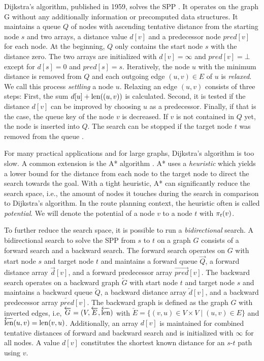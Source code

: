Dijkstra's algorithm, published in 1959, solves the SPP \cite{dijkstra:1959}. It operates on the graph G without any additionally information or precomputed data structures. It maintains a queue $Q$ of nodes with ascending tentative distance from the starting node $s$ and two arrays, a distance value $d[v]$ and a predecessor node $pred[v]$ for each node. At the beginning, $Q$ only contains the start node $s$ with the distance zero. The two arrays are initialized with $d[v]=\infty$ and $pred[v]=\bot$ except for $d[s]=0$ and $pred[s]=s$. Iteratively, the node $u$ with the minimum distance is removed from $Q$ and each outgoing edge $(u,v) \in E$ of $u$ is \emph{relaxed}. We call this process \emph{settling} a node $u$. Relaxing an edge $(u,v)$ consists of three steps: First, the sum $d[u] + \operatorname{len}((u,v))$ is calculated. Second, it is tested if the distance $d[v]$ can be improved by choosing $u$ as a predecessor. Finally, if that is the case, the queue key of the node $v$ is decreased. If $v$ is not contained in $Q$ yet, the node is inserted into $Q$. The search can be stopped if the target node $t$ was removed from the queue \cite{dijkstra:1959}.

For many practical applications and for large graphs, Dijkstra's algorithm is too slow. A common extension is the A* algorithm \cite{hart:1968}. A* uses a \emph{heuristic} which yields a lower bound for the distance from each node to the target node to direct the search towards the goal. With a tight heuristic, A* can significantly reduce the search space, i.e., the amount of nodes it touches during the search in comparison to Dijkstra's algorithm. In the route planning context, the heuristic often is called \emph{potential}. We will denote the potential of a node $v$ to a node $t$ with $\pi_t(v)$.

To further reduce the search space, it is possible to run a \emph{bidirectional} search. A bidirectional search to solve the SPP from $s$ to $t$ on a graph $G$ consists of a forward search and a backward search. The forward search operates on $G$ with start node $s$ and target node $t$ and maintains a forward queue $\overrightarrow{Q}$, a forward distance array $\overrightarrow{d}[v]$, and a forward predecessor array $\overrightarrow{pred}[v]$. The backward search operates on a backward graph $\overleftarrow{G}$ with start node $t$ and target node $s$ and maintains a backward queue $\overleftarrow{Q}$, a backward distance array $\overleftarrow{d}[v]$, and a backward predecessor array $\overleftarrow{pred}[v]$. The backward graph is defined as the graph $G$ with inverted edges, i.e, $\overleftarrow{G} = (V,\overleftarrow{E},\overleftarrow{\operatorname{len}})$ with $\overleftarrow{E} = \{(v,u) \in V \times V \mid (u,v) \in E\}$ and $\overleftarrow{\operatorname{len}}(u,v) = \operatorname{len}(v,u)$. Additionally, an array $d[v]$ is maintained for combined tentative distances of forward and backward search and is initialized with $\infty$ for all nodes. A value $d[v]$ constitutes the shortest known distance for an $s$-$t$ path using $v$.

